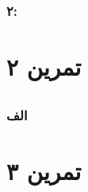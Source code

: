 \documentclass[]{exam}
\begin{document}
\subsubsection*{۲:}


\section*{تمرین ۲}


\subsection*{\color{blue}{جواب}}
\subsubsection*{الف}



\pagebreak
\section*{تمرین ۳}

\subsection*{\color{blue}{جواب}}


\end{document}
